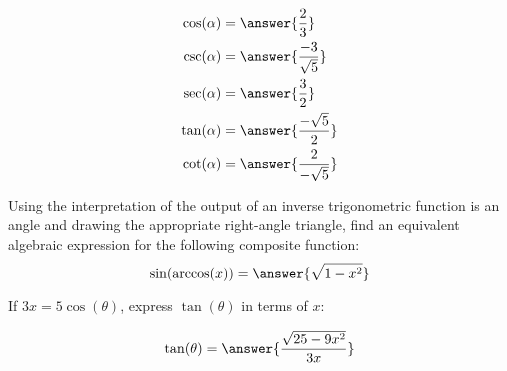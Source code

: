 \documentclass{ximera}
\begin{document}
\begin{exercise}
\begin{problem}
    \begin{align*}
      \cos(\alpha) &= \answer{\frac{2}{3}}  \\
      \csc(\alpha) &= \answer{\frac{-3}{\sqrt{5}}}  \\
      \sec(\alpha) &= \answer{\frac{3}{2}}  \\
      \tan(\alpha) &= \answer{\frac{-\sqrt{5}}{2}}  \\
      \cot(\alpha) &= \answer{\frac{2}{-\sqrt{5}}}
    \end{align*}  
\end{problem}

\begin{problem}
  Using the interpretation of the output of an inverse trigonometric function is an angle and drawing the appropriate right-angle triangle, find an equivalent algebraic expression for the following composite function:
  \[
    \sin(\arccos(x)) = \answer{\sqrt{1-x^2}}
  \]
\end{problem}

\begin{problem}
  If $3x = 5 \cos(\theta)$, express $\tan(\theta)$ in terms of $x$:
  
  \[
    \tan(\theta) = \answer{\frac{\sqrt{25- 9x^2}}{3x}}
  \]
\end{problem}

\end{exercise}
\end{document}
